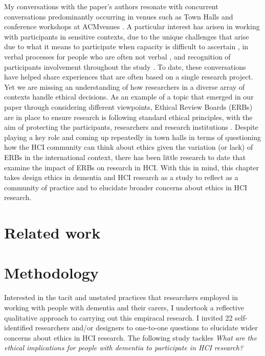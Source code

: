 My conversations with the paper's authors resonate with concurrent conversations predominantly occurring in venues such as Town Halls \citep{munteanu_sigchi_2019,bruckman_cscw_2017,frauenberger_research_2017} and conference workshops at ACMvenues \citep{waycott_ethical_2015,lazar_hcixdementia_2018}. A particular interest has arisen in working with participants in sensitive contexts, due to the unique challenges that arise due to what it means to participate when capacity is difficult to ascertain \citep{foley_printer_2019,lazar_using_2014}, in verbal processes for people who are often not verbal \citep{knapp_nonverbal_2013,kontos_integrating_2018,john_killick_claire_craig_creativity_2012}, and recognition of participants involvement throughout the study \citep{wallace_enabling_2012-1,lindsay_empathy_2012,morrissey_creative_2015}. To date, these conversations have helped share experiences that are often based on a single research project. Yet we are missing an understanding of how researchers in a diverse array of contexts handle ethical decisions. As an example of a topic that emerged in our paper through considering different viewpoints, Ethical Review Boards (ERBs) are in place to ensure research is following standard ethical principles, with the aim of protecting the participants, researchers and research institutions \citep{flicker_ethical_2007}. Despite playing a key role and coming up repeatedly in town halls in terms of questioning how the HCI community can think about ethics given the variation (or lack) of ERBs in the international context, there has been little research to date that examine the impact of ERBs on research in HCI. With this in mind, this chapter takes design ethics in dementia and HCI research as a study to reflect as a community of practice and to elucidate broader concerns about ethics in HCI research.

\section{Related work}
\label{Ethics:RelatedWork}

\section{Methodology}
\label{Ethics:Methodology}
Interested in the tacit and unstated practices that researchers employed in working with people with dementia and their carers, I undertook a reflective qualitative approach to carrying out this empiracal research. I invited 22 self-identified researchers and/or designers to one-to-one questions to elucidate wider concerns about ethics in HCI research. The following study tackles \textit{What are the ethical implications for people with dementia to participate in HCI research?}

